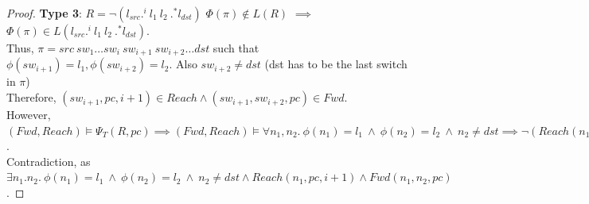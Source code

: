 \begin{proof}
	\newline \newline
	\textbf{Type 3}: $R = \neg (l_{src} .^i \ l_1 \ l_2 \ .^* l_{dst})$ \newline
	$\Phi(\pi) \not\in L(R)$ $\implies$ $\Phi(\pi) \in L (l_{src} .^i \ l_1 \ l_2 \ .^* l_{dst})$. \\
	Thus, $\pi = src\ sw_1 \ldots sw_i \ sw_{i+1} \ sw_{i+2} \ldots dst$ such that $\phi(sw_{i+1}) = l_1, \phi(sw_{i+2}) = l_2$. Also $sw_{i+2} \not=dst$ (dst has to be the last switch in $\pi$)\\
	Therefore,  $(sw_{i+1}, pc, i+1) \in Reach \wedge (sw_{i+1}, sw_{i+2}, pc) \in Fwd$. \\
	However,
	$(Fwd, Reach) \models \Psi_T(R, pc) \implies (Fwd, Reach) \models \forall n_1, n_2.~\phi(n_1) = l_1~\wedge~ \phi(n_2) = l_2 ~\wedge~ n_2 \not=dst  \implies 
	\neg (Reach(n_1, pc, i + 1) \wedge Fwd(n_1, n_2, pc))$. \\
	Contradiction, as $\exists n_1. n_2. ~\phi(n_1) = l_1~\wedge~ \phi(n_2) = l_2 ~\wedge~ n_2 \not=dst \wedge Reach(n_1, pc, i + 1) \wedge Fwd(n_1, n_2, pc)$. 
\end{proof}
\fi

